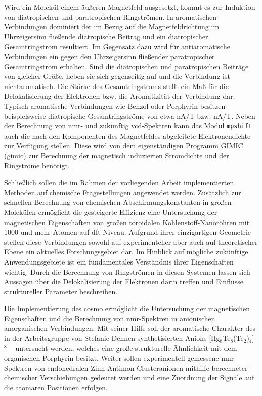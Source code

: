 \bigskip
Wird ein Molekül einem äußeren Magnetfeld ausgesetzt, kommt es zur Induktion von diatropischen und paratropischen Ringströmen.\supercite{taubert2011calculation} In aromatischen Verbindungen dominiert der im Bezug auf die Magnetfeldrichtung im Uhrzeigersinn fließende diatropische Beitrag und ein diatropischer Gesamtringstrom resultiert. Im Gegensatz dazu wird für antiaromatische Verbindungen ein gegen den Uhrzeigersinn fließender paratropischer Gesamtringstrom erhalten. Sind die diatropischen und paratropischen Beiträge von gleicher Größe, heben sie sich gegenseitig auf und die Verbindung ist nichtaromatisch. Die Stärke des Gesamtringstroms stellt ein Maß für die Delokalisierung der Elektronen bzw. die Aromatizität der Verbindung dar.\supercite{elvidge1961181,pople1966induced} Typisch aromatische Verbindungen wie Benzol oder Porphyrin besitzen beispielsweise diatropische Gesamtringströme von etwa \unit[12]{nA/T} bzw. \unit[27]{nA/T}.\supercite{fliegl2012aromatic} Neben der Berechnung von \ac{nmr}- und zukünftig \ac{vcd}-Spektren kann das Modul \texttt{mpshift} auch die nach den Komponenten des Magnetfeldes abgeleitete Elektronendichte zur Verfügung stellen. Diese wird von dem eigenständigen Programm GIMIC (\acl{gimic})\supercite{juselius2004calculation,taubert2011calculation,fliegl2011gauge,sundholm2016calculations} zur Berechnung der magnetisch induzierten Stromdichte und der Ringströme benötigt.

\bigskip
Schließlich sollen die im Rahmen der vorliegenden Arbeit implementierten Methoden auf chemische Fragestellungen angewendet werden. Zusätzlich zur schnellen Berechnung von chemischen Abschirmungskonstanten in großen Molekülen ermöglicht die gesteigerte Effizienz eine Untersuchung der magnetischen Eigenschaften von großen toroidalen Kohlenstoff-Nanoröhren mit 1000 und mehr Atomen auf \ac{dft}-Niveau. Aufgrund ihrer einzigartigen Geometrie stellen diese Verbindungen sowohl auf experimenteller aber auch auf theoretischer Ebene ein aktuelles Forschungsgebiet dar. Im Hinblick auf mögliche zukünftige Anwendungsgebiete ist ein fundamentales Verständnis ihrer Eigenschaften wichtig. Durch die Berechnung von Ringströmen in diesen Systemen lassen sich Aussagen über die Delokalisierung der Elektronen darin treffen und Einflüsse struktureller Parameter beschreiben. 

Die Implementierung des \ac{cosmo} ermöglicht die Untersuchung der magnetischen Eigenschaften und die Berechnung von \ac{nmr}-Spektren in anionischen anorganischen Verbindungen. Mit seiner Hilfe soll der aromatische Charakter des in der Arbeitsgruppe von Stefanie Dehnen synthetisierten Anions [Hg$_8$Te$_8$(Te$_2$)$_4$]$^{8-}$ untersucht werden, welches eine große strukturelle Ähnlichkeit mit dem organischen Porphyrin besitzt. Weiter sollen experimentell gemessene \ac{nmr}-Spektren von endohedralen Zinn-Antimon-Clusteranionen mithilfe berechneter chemischer Verschiebungen gedeutet werden und eine Zuordnung der Signale auf die atomaren Positionen erfolgen. 

